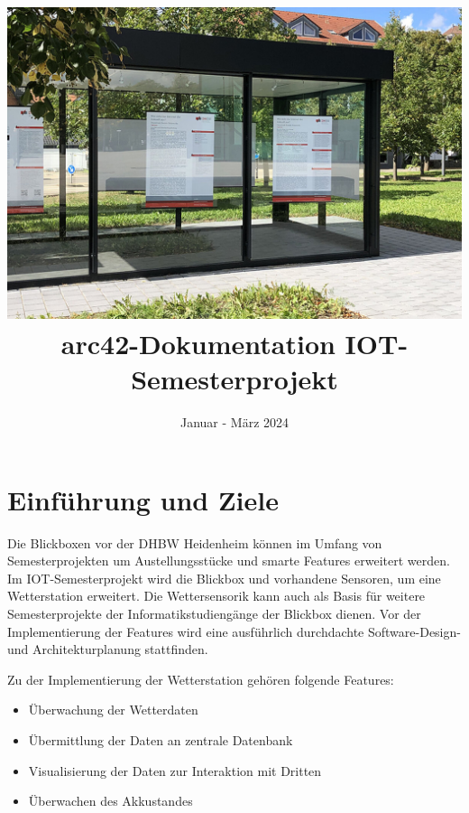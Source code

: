\documentclass[
]{article}
\title{\includegraphics{header.jpg} arc42-Dokumentation IOT-Semesterprojekt}
\author{}
\date{Januar - März 2024}
\begin{document}
\maketitle
\hypertarget{section-introduction-and-goals}{%
\section{Einführung und Ziele}\label{section-introduction-and-goals}}
Die Blickboxen vor der DHBW Heidenheim können im Umfang von Semesterprojekten um Austellungsstücke und smarte Features erweitert werden.
Im IOT-Semesterprojekt wird die Blickbox und vorhandene Sensoren, um eine Wetterstation erweitert.
Die Wettersensorik kann auch als Basis für weitere Semesterprojekte der Informatikstudiengänge der Blickbox dienen.
Vor der Implementierung der Features wird eine ausführlich durchdachte Software-Design- und Architekturplanung stattfinden.

Zu der Implementierung der Wetterstation gehören folgende Features:
\begin{itemize}
  \item Überwachung der Wetterdaten
  \item Übermittlung der Daten an zentrale Datenbank
  \item Visualisierung der Daten zur Interaktion mit Dritten
  \item Überwachen des Akkustandes
\end{itemize}
\end{document}
